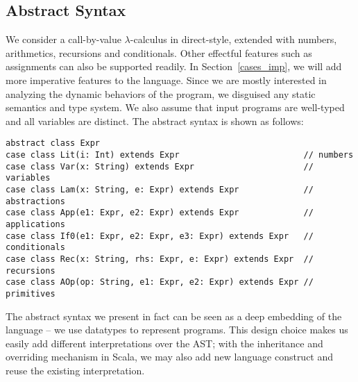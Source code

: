\subsection{Abstract Syntax} \label{bg_lang}

We consider a call-by-value $\lambda$-calculus in direct-style, extended
with numbers, arithmetics, recursions and conditionals. Other effectful features
such as assignments can also be supported readily. In Section~\ref{cases_imp}, we
will add more imperative features to the language. Since we are mostly
interested in analyzing the dynamic behaviors of the program, we disguised any
static semantics and type system. We also assume that input programs are
well-typed and all variables are distinct. The abstract syntax is shown as
follows:

\begin{lstlisting}
abstract class Expr
case class Lit(i: Int) extends Expr                         // numbers
case class Var(x: String) extends Expr                      // variables
case class Lam(x: String, e: Expr) extends Expr             // abstractions
case class App(e1: Expr, e2: Expr) extends Expr             // applications
case class If0(e1: Expr, e2: Expr, e3: Expr) extends Expr   // conditionals
case class Rec(x: String, rhs: Expr, e: Expr) extends Expr  // recursions
case class AOp(op: String, e1: Expr, e2: Expr) extends Expr // primitives
\end{lstlisting}

The abstract syntax we present in fact can be seen as a deep embedding of the
language -- we use datatypes to represent programs. This design choice makes us
easily add different interpretations over the AST; with the inheritance and
overriding mechanism in Scala, we may also add new language construct and reuse
the existing interpretation.

\iffalse
We will give the concrete semantics using a big-step definitional
interpreter. The interpreter is a recursive function that takes the program AST,
environment and store, and returns the evaluated value and the accompanied
store. The environment is a mapping from identifiers to addresses, and the store
is a mapping from addresses to values. We use the store to model recursion and
mutation in concrete semantics; it is also useful for polyvariant analysis. This
environment-and-store-passing style big-step interpreter is standard and can
also be obtained by refunctionalizing \cite{DBLP:conf/ppdp/AgerBDM03,
Wei:2018:RAA:3243631.3236800} a small-step CESK machine
\cite{DBLP:conf/popl/FelleisenF87}.
\fi

